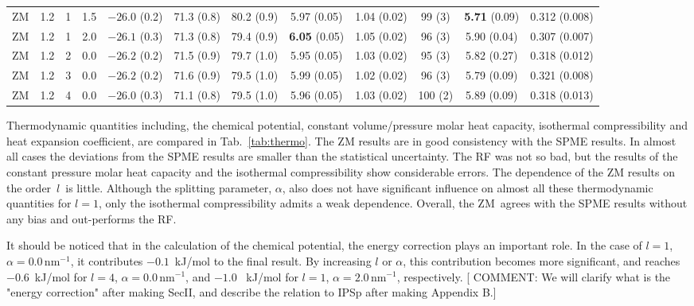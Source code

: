 \documentclass[a4paper,preprint,unsortedaddress,onecolumn,fleqn]{revtex4}
\begin{document}
\begin{sidewaystable}
\begin{tabular*}{0.99\textwidth}{@{\extracolsep{\fill}}cccc cccccccc}
    ZM          &1.2 & 1  &1.5 & $-26.0$ (0.2) & 71.3 (0.8)  &80.2 (0.9)           & 5.97 (0.05)               &1.04 (0.02)          & 99 (3)          & \textbf{5.71} (0.09)&        {0.312} (0.008)\\ 
    ZM          &1.2 & 1  &2.0 & $-26.1$ (0.3) & 71.3 (0.8)  &79.4 (0.9)           & \textbf{6.05} (0.05)      &1.05 (0.02)          & 96 (3)          &        {5.90} (0.04)&        {0.307} (0.007)\\\hline
    ZM          &1.2 & 2  &0.0 & $-26.2$ (0.2) & 71.5 (0.9)  &79.7 (1.0)           & 5.95 (0.05)               &1.03 (0.02)          & 95 (3)          &         5.82  (0.27)&         0.318  (0.012)\\
    ZM          &1.2 & 3  &0.0 & $-26.2$ (0.2) & 71.6 (0.9)  &79.5 (1.0)           & 5.99 (0.05)               &1.02 (0.02)          & 96 (3)          &         5.79  (0.09)&         0.321  (0.008)\\
    ZM          &1.2 & 4  &0.0 & $-26.0$ (0.3) & 71.1 (0.8)  &79.5 (1.0)           & 5.96 (0.05)               &1.03 (0.02)          &100 (2)          &         5.89  (0.09)&         0.318  (0.013)\\
    \hline\hline
  \end{tabular*}
  \label{tab:thermo}
\end{sidewaystable}

Thermodynamic quantities including, the chemical potential, constant
volume/pressure molar heat capacity, isothermal compressibility and heat
expansion coefficient, are compared in Tab.~\ref{tab:thermo}. The ZM results
are in good consistency with the SPME results. In almost all cases the
deviations from the SPME results are smaller than the statistical
uncertainty. The RF was not so bad, but the results of the constant pressure
molar heat capacity and the isothermal compressibility show considerable
errors. The dependence of the ZM results on the order\ $l$\ is little.
Although the splitting parameter, $\alpha $, also does not have significant
influence on almost all these thermodynamic quantities for $l=1$, only the
isothermal compressibility admits a weak dependence. Overall, the ZM\ agrees
with the SPME results without any bias and out-performs the RF.

It should be noticed that in the calculation of the chemical potential, the
energy correction plays an important role. In the case of $l=1$, $\alpha
=0.0\,\text{nm}^{-1}$, it contributes $-0.1$~kJ/mol to the final result. By
increasing $l$ or $\alpha $, this contribution becomes more significant, and
reaches $-0.6$~kJ/mol for $l=4$, $\alpha =0.0\,\text{nm}^{-1}$, and $-1.0$%
~kJ/mol for $l=1$, $\alpha =2.0\,\text{nm}^{-1}$, respectively. [{%
\color{blue}COMMENT: We will clarify what is the "energy correction" after
making SecII, and describe the relation to IPSp after making Appendix B.}]
\end{document}
